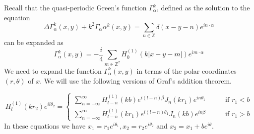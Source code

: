 \documentclass[a4paper]{article}
\theoremstyle{definition}
\newcommand{\Z}{\mathbb{Z}}
\begin{document}
Recall that the quasi-periodic Green's function $\Gamma_\alpha^k$, defined as the solution to the equation
\begin{equation*}
\Delta \Gamma_\alpha^k(x,y) + k^2\Gamma_\alpha\alpha^k(x,y) = \sum_{n\in \Z} \delta(x-y-n)e^{in\cdot\alpha}
\end{equation*}
can be expanded as 
\begin{equation} \label{eq:quasihomogenious}
\Gamma_\alpha^k(x,y) = -\frac{i}{4}\sum_{m\in \Z^2} H_0^{(1)}(k|x-y-m|)e^{im\cdot\alpha}
\end{equation}
We need to expand the function $\Gamma_\alpha^k(x,y)$ in terms of the polar coordinates $(r,\theta)$ of $x$. We will use the following versions of Graf's addition theorem.

\begin{equation*}
H_l^{(1)}(kr_2)e^{il\theta_2} =
\begin{cases}
\sum_{n=-\infty}^\infty H_{l-n}^{(1)}(kb)e^{i(l-n)\beta}J_n(kr_1)e^{in\theta_1} \qquad &\text{if } r_1<b \\
\sum_{n=-\infty}^\infty H_{l-n}^{(1)}(kr_1)e^{i(l-n)\theta_1}J_n(kb)e^{in\beta} \qquad &\text{if } r_1>b
\end{cases}
\end{equation*}
In these equations we have $x_1 = r_1e^{i\theta_1}, x_2 = r_2e^{i\theta_2}$ and $x_2 = x_1 + be^{i\theta}$. 
\end{document}
